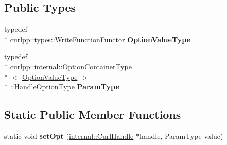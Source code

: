 \subsection*{Public Types}
\begin{DoxyCompactItemize}
\item 
\hypertarget{classcurlpp_1_1internal_1_1OptionSetter_3_01curlpp_1_1types_1_1WriteFunctionFunctor_00_01CURLOPT__HEADERFUNCTION_01_4_a0183970d359f69e0495b310e3a8d555c}{typedef \\*
\hyperlink{classutilspp_1_1Functor}{curlpp\-::types\-::\-Write\-Function\-Functor} {\bfseries Option\-Value\-Type}}\label{classcurlpp_1_1internal_1_1OptionSetter_3_01curlpp_1_1types_1_1WriteFunctionFunctor_00_01CURLOPT__HEADERFUNCTION_01_4_a0183970d359f69e0495b310e3a8d555c}

\item 
\hypertarget{classcurlpp_1_1internal_1_1OptionSetter_3_01curlpp_1_1types_1_1WriteFunctionFunctor_00_01CURLOPT__HEADERFUNCTION_01_4_a0f08d7bd4ae479f495ceee4ce5dd0827}{typedef \\*
\hyperlink{structcurlpp_1_1internal_1_1OptionContainerType}{curlpp\-::internal\-::\-Option\-Container\-Type}\\*
$<$ \hyperlink{classutilspp_1_1Functor}{Option\-Value\-Type} $>$\\*
\-::Handle\-Option\-Type {\bfseries Param\-Type}}\label{classcurlpp_1_1internal_1_1OptionSetter_3_01curlpp_1_1types_1_1WriteFunctionFunctor_00_01CURLOPT__HEADERFUNCTION_01_4_a0f08d7bd4ae479f495ceee4ce5dd0827}

\end{DoxyCompactItemize}
\subsection*{Static Public Member Functions}
\begin{DoxyCompactItemize}
\item 
\hypertarget{classcurlpp_1_1internal_1_1OptionSetter_3_01curlpp_1_1types_1_1WriteFunctionFunctor_00_01CURLOPT__HEADERFUNCTION_01_4_ad8d1021033e805e9f0f90b7d8289a14c}{static void {\bfseries set\-Opt} (\hyperlink{classcurlpp_1_1internal_1_1CurlHandle}{internal\-::\-Curl\-Handle} $\ast$handle, Param\-Type value)}\label{classcurlpp_1_1internal_1_1OptionSetter_3_01curlpp_1_1types_1_1WriteFunctionFunctor_00_01CURLOPT__HEADERFUNCTION_01_4_ad8d1021033e805e9f0f90b7d8289a14c}

\end{DoxyCompactItemize}


